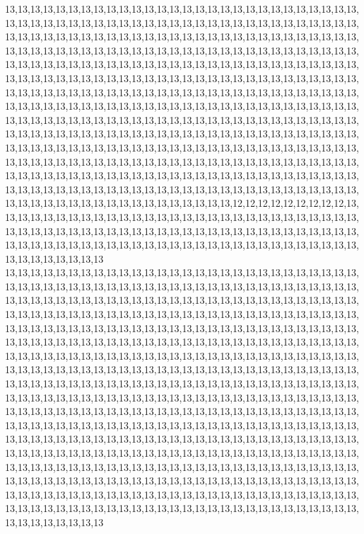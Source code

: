 13,13,13,13,13,13,13,13,13,13,13,13,13,13,13,13,13,13,13,13,13,13,13,13,13,13,13,13,13,13,13,13,13,13,13,13,13,13,13,13,13,13,13,13,13,13,13,13,13,13,13,13,13,13,13,13,13,13,13,13,13,13,13,13,13,13,13,13,13,13,13,13,13,13,13,13,13,13,13,13,13,13,13,13,13,13,13,13,13,13,13,13,13,13,13,13,13,13,13,13,13,13,13,13,13,13,13,13,13,13,13,13,13,13,13,13,13,13,13,13,13,13,13,13,13,13,13,13,13,13,13,13,13,13,13,13,13,13,13,13,13,13,13,13,13,13,13,13,13,13,13,13,13,13,13,13,13,13,13,13,13,13,13,13,13,13,13,13,13,13,13,13,13,13,13,13,13,13,13,13,13,13,13,13,13,13,13,13,13,13,13,13,13,13,13,13,13,13,13,13,13,13,13,13,13,13,13,13,13,13,13,13,13,13,13,13,13,13,13,13,13,13,13,13,13,13,13,13,13,13,13,13,13,13,13,13,13,13,13,13,13,13,13,13,13,13,13,13,13,13,13,13,13,13,13,13,13,13,13,13,13,13,13,13,13,13,13,13,13,13,13,13,13,13,13,13,13,13,13,13,13,13,13,13,13,13,13,13,13,13,13,13,13,13,13,13,13,13,13,13,13,13,13,13,13,13,13,13,13,13,13,13,13,13,13,13,13,13,13,13,13,13,13,13,13,13,13,13,13,13,13,13,13,13,13,13,13,13,13,13,13,13,13,13,13,13,13,13,13,13,13,13,13,13,13,13,13,13,13,13,13,13,13,13,13,13,13,13,13,13,13,13,13,13,13,13,13,13,13,13,13,13,13,13,13,13,13,13,13,13,13,13,13,13,13,13,13,13,13,13,13,13,13,13,13,13,13,13,13,13,12,12,12,12,12,12,12,12,12,13,13,13,13,13,13,13,13,13,13,13,13,13,13,13,13,13,13,13,13,13,13,13,13,13,13,13,13,13,13,13,13,13,13,13,13,13,13,13,13,13,13,13,13,13,13,13,13,13,13,13,13,13,13,13,13,13,13,13,13,13,13,13,13,13,13,13,13,13,13,13,13,13,13,13,13,13,13,13,13,13,13,13,13,13,13,13,13,13,13,13,13,13
13,13,13,13,13,13,13,13,13,13,13,13,13,13,13,13,13,13,13,13,13,13,13,13,13,13,13,13,13,13,13,13,13,13,13,13,13,13,13,13,13,13,13,13,13,13,13,13,13,13,13,13,13,13,13,13,13,13,13,13,13,13,13,13,13,13,13,13,13,13,13,13,13,13,13,13,13,13,13,13,13,13,13,13,13,13,13,13,13,13,13,13,13,13,13,13,13,13,13,13,13,13,13,13,13,13,13,13,13,13,13,13,13,13,13,13,13,13,13,13,13,13,13,13,13,13,13,13,13,13,13,13,13,13,13,13,13,13,13,13,13,13,13,13,13,13,13,13,13,13,13,13,13,13,13,13,13,13,13,13,13,13,13,13,13,13,13,13,13,13,13,13,13,13,13,13,13,13,13,13,13,13,13,13,13,13,13,13,13,13,13,13,13,13,13,13,13,13,13,13,13,13,13,13,13,13,13,13,13,13,13,13,13,13,13,13,13,13,13,13,13,13,13,13,13,13,13,13,13,13,13,13,13,13,13,13,13,13,13,13,13,13,13,13,13,13,13,13,13,13,13,13,13,13,13,13,13,13,13,13,13,13,13,13,13,13,13,13,13,13,13,13,13,13,13,13,13,13,13,13,13,13,13,13,13,13,13,13,13,13,13,13,13,13,13,13,13,13,13,13,13,13,13,13,13,13,13,13,13,13,13,13,13,13,13,13,13,13,13,13,13,13,13,13,13,13,13,13,13,13,13,13,13,13,13,13,13,13,13,13,13,13,13,13,13,13,13,13,13,13,13,13,13,13,13,13,13,13,13,13,13,13,13,13,13,13,13,13,13,13,13,13,13,13,13,13,13,13,13,13,13,13,13,13,13,13,13,13,13,13,13,13,13,13,13,13,13,13,13,13,13,13,13,13,13,13,13,13,13,13,13,13,13,13,13,13,13,13,13,13,13,13,13,13,13,13,13,13,13,13,13,13,13,13,13,13,13,13,13,13,13,13,13,13,13,13,13,13,13,13,13,13,13,13,13,13,13,13,13,13,13,13,13,13,13,13,13,13,13,13,13,13,13,13,13,13,13,13,13,13,13,13,13,13,13,13,13,13,13,13,13,13,13,13,13,13,13,13,13,13,13,13,13,13,13,13,13,13,13,13,13,13
